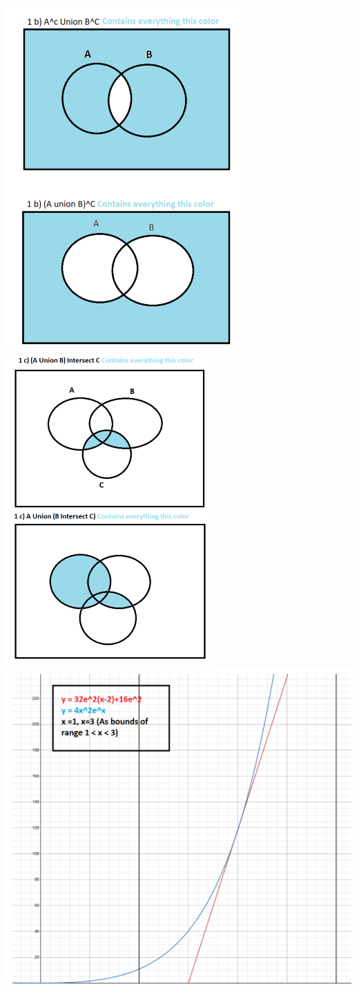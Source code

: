 \documentclass[12pt,twoside]{article}
\begin{document}
\break
\includegraphics{hw01b.png} 
\includegraphics{hw01c.png} \\
\includegraphics{hw03d.png}
\end{document}
